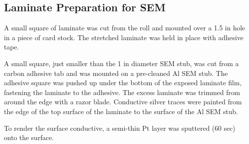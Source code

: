 \subsection{Laminate Preparation for SEM}

A small square of laminate was cut from the roll and
mounted over a 1.5 in hole in a piece of card stock.
The stretched laminate was held in place with adhesive
tape.

A small square, just smaller than the 1 in diameter SEM
stub, was cut from a carbon adhesive tab and was mounted
on a pre-cleaned Al SEM stub. The adhesive square was pushed
up under the bottom of the exposed laminate film, fastening the
laminate to the adhesive. The excess laminate was trimmed from
around the edge with a razor blade. Conductive silver traces
were painted from the edge of the top surface of the
laminate to the surface of the Al SEM stub.

To render the surface conductive, a semi-thin Pt
layer was sputtered (60 sec) onto the surface.

\endinput
